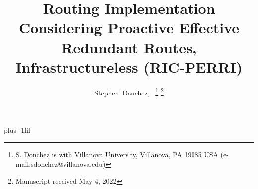 \documentclass[11pt, journal, onecolumn, letterpaper,]{LaTeX_Assets/IEEETransactions_LaTeX/IEEEtran/IEEEtran}
\begin{document}
    \title{Routing Implementation Considering Proactive Effective Redundant Routes, Infrastructureless (RIC-PERRI)}
    \author{Stephen~Donchez,~%
    \thanks{S. Donchez is with Villanova University, Villanova, PA 19085 USA 
    \mbox{(e-mail:sdonchez@villanova.edu)}}%
    \thanks{Manuscript received May 4, 2022}}%

    \maketitle


    

    
    
    

    

    
    

    \vskip 0pt plus -1fil

    
\end{document}
